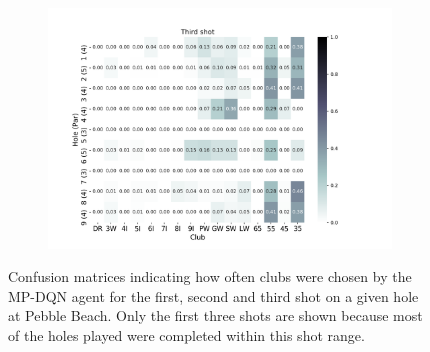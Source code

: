 \documentclass{kththesis}
\begin{document}
\begin{figure}
\begin{subfigure}{\textwidth}
    \includegraphics[height=0.3\textheight]{AgentClubChoices/MPDQN_Pebble_Club_Choices_Third_Shot.png} 
    \end{subfigure}
    \caption{Confusion matrices indicating how often clubs were chosen by the MP-DQN agent for the first, second and third shot on a given hole at Pebble Beach. Only the first three shots are shown because most of the holes played were completed within this shot range.}
    \label{fig:MPDQN_pebble_club_choice_confusion}
\end{figure}
\end{document}
